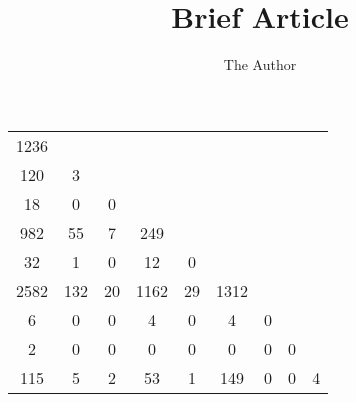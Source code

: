 \documentclass[11pt]{article}
\title{Brief Article}
\author{The Author}
\begin{document}
\maketitle





\begin{tabular}{ccccccccc}
\cline{1-1}
\multicolumn{1}{|c|}{1236}  \\
\cline{1-2}
\multicolumn{1}{|c|}{120} & 
\multicolumn{1}{|c|}{3}  \\
\cline{1-3}
\multicolumn{1}{|c|}{18} & 
\multicolumn{1}{|c|}{0} & 
\multicolumn{1}{|c|}{0}  \\
\cline{1-4}
\multicolumn{1}{|c|}{982} & 
\multicolumn{1}{|c|}{55} & 
\multicolumn{1}{|c|}{7} & 
\multicolumn{1}{|c|}{249}  \\
\cline{1-5}
\multicolumn{1}{|c|}{32} & 
\multicolumn{1}{|c|}{1} & 
\multicolumn{1}{|c|}{0} & 
\multicolumn{1}{|c|}{12} & 
\multicolumn{1}{|c|}{0}  \\
\cline{1-6}
\multicolumn{1}{|c|}{2582} & 
\multicolumn{1}{|c|}{132} & 
\multicolumn{1}{|c|}{20} & 
\multicolumn{1}{|c|}{1162} & 
\multicolumn{1}{|c|}{29} & 
\multicolumn{1}{|c|}{1312}  \\
\cline{1-7}
\multicolumn{1}{|c|}{6} & 
\multicolumn{1}{|c|}{0} & 
\multicolumn{1}{|c|}{0} & 
\multicolumn{1}{|c|}{4} & 
\multicolumn{1}{|c|}{0} & 
\multicolumn{1}{|c|}{4} & 
\multicolumn{1}{|c|}{0}  \\
\cline{1-8}
\multicolumn{1}{|c|}{2} & 
\multicolumn{1}{|c|}{0} & 
\multicolumn{1}{|c|}{0} & 
\multicolumn{1}{|c|}{0} & 
\multicolumn{1}{|c|}{0} & 
\multicolumn{1}{|c|}{0} & 
\multicolumn{1}{|c|}{0} & 
\multicolumn{1}{|c|}{0}  \\
\cline{1-9}
\multicolumn{1}{|c|}{115} & 
\multicolumn{1}{|c|}{5} & 
\multicolumn{1}{|c|}{2} & 
\multicolumn{1}{|c|}{53} & 
\multicolumn{1}{|c|}{1} & 
\multicolumn{1}{|c|}{149} & 
\multicolumn{1}{|c|}{0} & 
\multicolumn{1}{|c|}{0} & 
\multicolumn{1}{|c|}{4}  \\
\cline{1-9}
\end{tabular}
\end{document}
